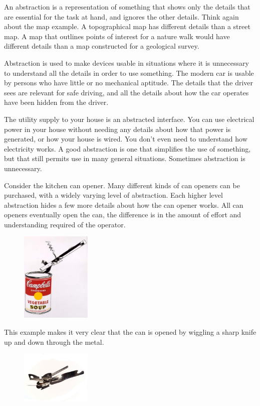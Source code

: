 An abstraction is a representation of something that shows only the details that are essential for the task at hand, and ignores the other details. Think again about the map example. A topographical map has different details than a street map. A map that outlines points of interest for a nature walk would have different details than a map constructed for a geological survey.

Abstraction is used to make devices usable in situations where it is unnecessary to understand all the details in order to use something. The modern car is usable by persons who have little or no mechanical aptitude. The details that the driver sees are relevant for safe driving, and all the details about how the car operates have been hidden from the driver.

The utility supply to your house is an abstracted interface. You can use electrical power in your house without needing any details about how that power is generated, or how your house is wired. You don't even need to understand how electricity works.
A good abstraction is one that simplifies the use of something, but that still permits use in many general situations. Sometimes abstraction is unnecessary.


Consider the kitchen can opener. Many different kinds of can openers can be purchased, with a widely varying level of abstraction. Each higher level abstraction hides a few more details about how the can opener works. All can openers eventually open the can, the difference is in the amount of effort and understanding required of the operator.

\begin{figure}[H]
\centering
\includegraphics[width=0.3\textwidth]{pictures/Campbell_s_Soup_with_Can_Opener.jpg}
\label{fig:canOpener1}
\end{figure}

This example makes it very clear that the can is opened by wiggling a sharp knife up and down through the metal.

\begin{figure}[H]
\centering
\includegraphics[width=0.3\textwidth]{pictures/800px-Can_Opener.jpg}
\label{fig:canOpener2}
\end{figure}

